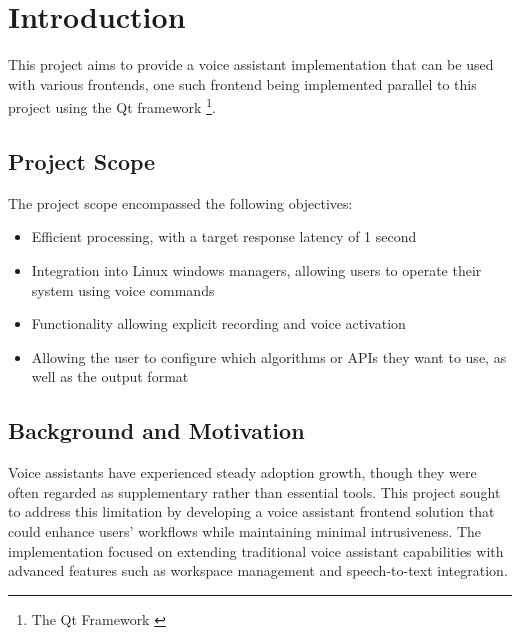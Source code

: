 \renewcommand*\chapterpagestyle{scrheadings}
\chapter{Introduction}

This project aims to provide a voice assistant implementation that can be used with various frontends,
one such frontend being implemented parallel to this project using the Qt framework \footnote{The Qt Framework \cite{qt}}.

\section{Project Scope}
The project scope encompassed the following objectives:
\begin{itemize}
    \item Efficient processing, with a target response latency of 1 second
    \item Integration into Linux windows managers, allowing users to operate their system using voice commands
    \item Functionality allowing explicit recording and voice activation
    \item Allowing the user to configure which algorithms or APIs they want to use, as well as the output format
\end{itemize}

\section{Background and Motivation}
Voice assistants have experienced steady adoption growth,
though they were often regarded as supplementary rather than essential tools.
This project sought to address this limitation
by developing a voice assistant frontend solution that could enhance users' workflows
while maintaining minimal intrusiveness.
The implementation focused on extending traditional voice assistant capabilities
with advanced features such as workspace management and speech-to-text integration.